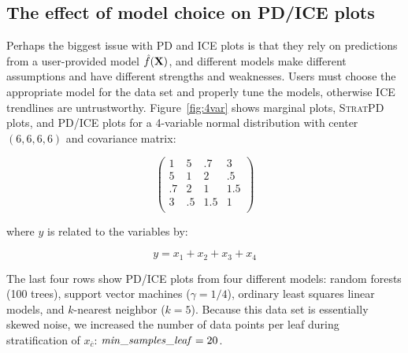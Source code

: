 \documentclass[12pt]{article}
\newcommand{\figref}[1]{Figure~\ref{#1}}
\newcommand{\spd}{\fontfamily{cmr}\textsc{\small StratPD}}
\newcommand{\xnc}{$x_{\overline{c}}$}
\begin{document}
\subsection{The effect of model choice on PD/ICE plots}

Perhaps the biggest issue with PD and ICE plots is that they rely on predictions from a user-provided model $\hat{f}(\bf X)$, and different models make different assumptions and have different strengths and weaknesses.  Users must choose the appropriate model for the data set and properly tune the models, otherwise ICE trendlines are untrustworthy. \figref{fig:4var} shows marginal plots, \spd{} plots, and PD/ICE plots for a 4-variable normal distribution with center $(6, 6, 6, 6)$ and covariance matrix:

\[
\left(
\begin{array}{cccc}
1 & 5 &.7 & 3\\
5 &1 &2 &.5\\
.7 &2 & 1 & 1.5\\
3 &.5 &1.5 &1\\
\end{array}
\right)
\]

\noindent where $y$ is related to the variables by:

\begin{equation}\label{eq:4var}
y = x_1 + x_2 + x_3 + x_4
\end{equation}

\noindent The last four rows show PD/ICE plots from four different models: random forests (100 trees), support vector machines ($\gamma=1/4$), ordinary least squares linear models, and $k$-nearest neighbor ($k=5$).  Because this data set is essentially skewed noise, we increased the number of data points per leaf during stratification of \xnc{}: ${\it min\_samples\_leaf} = 20$.
\end{document}
